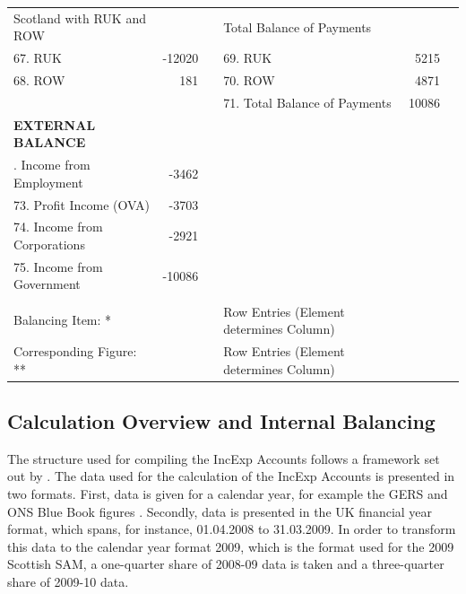\begin{table}[H]
\begin{scriptsize}
\begin{centering}
\begin{spacing}{1.2}
\begin{tabular}{lrllrl}
    \hline
\bigstrut[t] \quad \enspace \thinspace Scotland with RUK and ROW & &   & \quad \enspace \thinspace Total Balance of Payments & & \\
       67. RUK & -12020 & & 69. RUK & 5215 &  \\
       68. ROW & 181 & & 70. ROW & 4871 & \\
       & & & 71. Total Balance of Payments & 10086 & \\  
    \hline    
    \textbf{EXTERNAL BALANCE} \bigstrut\\
    \hline
\bigstrut[t]   72. Income from Employment & -3462 & & & & \\
       73. Profit Income (OVA) & -3703 & & & &  \\
       74. Income from Corporations & -2921 & & & & \\
       75. Income from Government & -10086 & & & & \\ 
    \bottomrule  \bigstrut[b]\\
\qquad \qquad \qquad Balancing Item: *   & & & Row Entries (Element determines Column)  \\ 
\qquad \qquad \qquad Corresponding Figure: ** & & & Row Entries (Element determines Column)  \bigstrut\\       
   \end{tabular}%
\bigskip \begin{flushright}\end{flushright} \label{tab:2.4.1}
\end{spacing} \end{centering}  \end{scriptsize} \end{table}

\subsection{Calculation Overview and Internal Balancing}
\label{sec:2.4.2}

\bigskip

The structure used for compiling the IncExp Accounts follows a framework set out by . The data used for the calculation of the IncExp Accounts is presented in two formats. First, data is given for a calendar year, for example the GERS and ONS Blue Book figures \cite{ScotGov2013b,ONS2011c}. Secondly, data is presented in the UK financial year format, which spans, for instance, 01.04.2008 to 31.03.2009. In order to transform this data to the calendar year format 2009, which is the format used for the 2009 Scottish SAM, a one-quarter share of 2008-09 data is taken and a three-quarter share of 2009-10 data.

